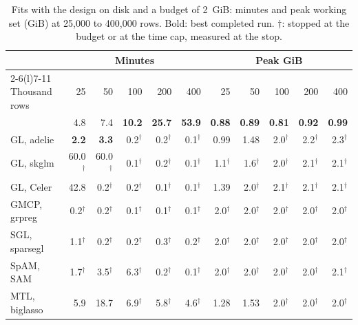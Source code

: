 \begin{table}[t]
\caption{Fits with the design on disk and a budget of 2~GiB: minutes and peak working set (GiB) at 25{,}000 to 400{,}000 rows. Bold: best completed run. $\dagger$: stopped at the budget or at the time cap, measured at the stop.}
\label{tab:ooc}
\centering
\scriptsize
\setlength{\tabcolsep}{1.2pt}
\begin{tabular*}{\columnwidth}{@{\extracolsep{\fill}}lrrrrrrrrrr@{}}
\toprule
& \multicolumn{5}{c}{Minutes} & \multicolumn{5}{c}{Peak GiB}\\
\cmidrule(lr){2-6}\cmidrule(l){7-11}
Thousand rows & 25 & 50 & 100 & 200 & 400 & 25 & 50 & 100 & 200 & 400\\
\midrule
\sys{} & 4.8 & 7.4 & \textbf{10.2} & \textbf{25.7} & \textbf{53.9} & \textbf{0.88} & \textbf{0.89} & \textbf{0.81} & \textbf{0.92} & \textbf{0.99}\\
GL, adelie & \textbf{2.2} & \textbf{3.3} & 0.2$^\dagger$ & 0.2$^\dagger$ & 0.1$^\dagger$ & 0.99 & 1.48 & 2.0$^\dagger$ & 2.2$^\dagger$ & 2.3$^\dagger$\\
GL, skglm & 60.0$^\dagger$ & 60.0$^\dagger$ & 0.1$^\dagger$ & 0.2$^\dagger$ & 0.1$^\dagger$ & 1.1$^\dagger$ & 1.6$^\dagger$ & 2.0$^\dagger$ & 2.1$^\dagger$ & 2.1$^\dagger$\\
GL, Celer & 42.8 & 0.2$^\dagger$ & 0.2$^\dagger$ & 0.1$^\dagger$ & 0.1$^\dagger$ & 1.39 & 2.0$^\dagger$ & 2.1$^\dagger$ & 2.1$^\dagger$ & 2.1$^\dagger$\\
GMCP, grpreg & 0.2$^\dagger$ & 0.2$^\dagger$ & 0.1$^\dagger$ & 0.1$^\dagger$ & 0.1$^\dagger$ & 2.0$^\dagger$ & 2.0$^\dagger$ & 2.0$^\dagger$ & 2.0$^\dagger$ & 2.0$^\dagger$\\
SGL, sparsegl & 1.1$^\dagger$ & 0.2$^\dagger$ & 0.2$^\dagger$ & 0.3$^\dagger$ & 0.2$^\dagger$ & 2.0$^\dagger$ & 2.0$^\dagger$ & 2.0$^\dagger$ & 2.0$^\dagger$ & 2.0$^\dagger$\\
SpAM, SAM & 1.7$^\dagger$ & 3.5$^\dagger$ & 6.3$^\dagger$ & 0.2$^\dagger$ & 0.1$^\dagger$ & 2.0$^\dagger$ & 2.0$^\dagger$ & 2.0$^\dagger$ & 2.0$^\dagger$ & 2.1$^\dagger$\\
MTL, biglasso & 5.9 & 18.7 & 6.9$^\dagger$ & 5.8$^\dagger$ & 4.6$^\dagger$ & 1.28 & 1.53 & 2.0$^\dagger$ & 2.0$^\dagger$ & 2.0$^\dagger$\\
\bottomrule
\end{tabular*}
\end{table}
